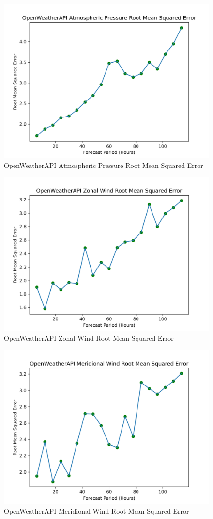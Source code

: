 \begin{appendices}
    \begin{figure}[H]
        \centering
        \includegraphics[width=.7\linewidth]{Graphs/accuracy/appendices/openweatherapi/atmospheric_pressure/root_mean_squared_error.png}
        \caption{OpenWeatherAPI Atmospheric Pressure Root Mean Squared Error}
    \end{figure}
    
    \begin{figure}[H]
        \centering
        \includegraphics[width=.7\linewidth]{Graphs/accuracy/appendices/openweatherapi/zonal_wind/root_mean_squared_error.png}
        \caption{OpenWeatherAPI Zonal Wind Root Mean Squared Error}
    \end{figure}
    
    \begin{figure}[H]
        \centering
        \includegraphics[width=.7\linewidth]{Graphs/accuracy/appendices/openweatherapi/meridional_wind/root_mean_squared_error.png}
        \caption{OpenWeatherAPI Meridional Wind Root Mean Squared Error}
    \end{figure}
    

\end{appendices}
